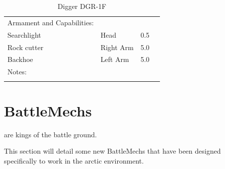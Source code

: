 \documentclass{tufte-book}
\begin{document}
\begin{table}
\begin{minipage}{\textwidth}
\begin{center}
\begin{tabular}{llll}
Armament and Capabilities: & & \\
\quad Searchlight & Head & 0.5 \\
\quad Rock cutter & Right Arm & 5.0 \\
\quad Backhoe & Left Arm & 5.0 \\

Notes: & & \\
\multicolumn{3}{l}{\quad } \\

\bottomrule
\end{tabular}
\end{center}
\end{minipage}
\caption{Digger DGR-1F}
\end{table}

\chapter{BattleMechs}
\label{ch:battlemechs}


 are kings of the battle ground. 

This section will detail some new BattleMechs that have been
designed specifically to work in the arctic environment.

\clearpage








\backmatter

% 
% 


\printindex
\end{document}
